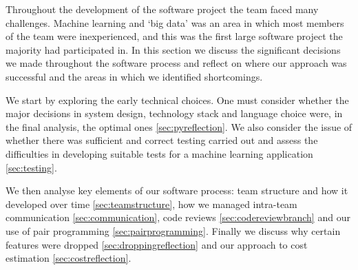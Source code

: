 \documentclass{l3proj}
\begin{document}
%
% 
%
%

Throughout the development of the software project the team faced many challenges. Machine learning and ‘big data’ was an area in which most members of the team were inexperienced, and this was the first large software project the majority had participated in. In this section we discuss the significant decisions we made throughout the software process and reflect on where our approach was successful and the areas in which we identified shortcomings. 

We start by exploring the early technical choices. One must consider whether the major decisions in system design, technology stack and language choice were, in the final analysis, the optimal ones \ref{sec:pyreflection}. We also consider the issue of whether there was sufficient and correct testing carried out and assess the difficulties in developing suitable tests for a machine learning application \ref{sec:testing}.

We then analyse key elements of our software process: team structure and how it developed over time \ref{sec:teamstructure}, how we managed intra-team communication  \ref{sec:communication}, code reviews \ref{sec:codereviewbranch} and our use of pair programming \ref{sec:pairprogramming}. Finally we discuss why certain features were dropped \ref{sec:droppingreflection} and our approach to cost estimation \ref{sec:costreflection}.
\end{document}
